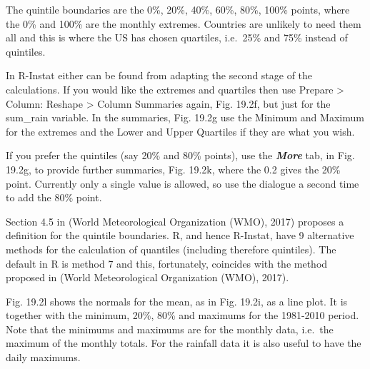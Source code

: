 \documentclass[
  letterpaper,
  DIV=11,
  numbers=noendperiod]{scrreprt}
\begin{document}
The quintile boundaries are the 0\%, 20\%, 40\%, 60\%, 80\%, 100\%
points, where the 0\% and 100\% are the monthly extremes. Countries are
unlikely to need them all and this is where the US has chosen quartiles,
i.e.~25\% and 75\% instead of quintiles.

In R-Instat either can be found from adapting the second stage of the
calculations. If you would like the extremes and quartiles then use
Prepare \textgreater{} Column: Reshape \textgreater{} Column Summaries
again, Fig. 19.2f, but just for the sum\_rain variable. In the
summaries, Fig. 19.2g use the Minimum and Maximum for the extremes and
the Lower and Upper Quartiles if they are what you wish.

If you prefer the quintiles (say 20\% and 80\% points), use the
\textbf{\emph{More}} tab, in Fig. 19.2g, to provide further summaries,
Fig. 19.2k, where the 0.2 gives the 20\% point. Currently only a single
value is allowed, so use the dialogue a second time to add the 80\%
point.

Section 4.5 in (World Meteorological Organization (WMO), 2017) proposes
a definition for the quintile boundaries. R, and hence R-Instat, have 9
alternative methods for the calculation of quantiles (including
therefore quintiles). The default in R is method 7 and this,
fortunately, coincides with the method proposed in (World Meteorological
Organization (WMO), 2017).

Fig. 19.2l shows the normals for the mean, as in Fig. 19.2i, as a line
plot. It is together with the minimum, 20\%, 80\% and maximums for the
1981-2010 period. Note that the minimums and maximums are for the
monthly data, i.e.~the maximum of the monthly totals. For the rainfall
data it is also useful to have the daily maximums.
\end{document}
